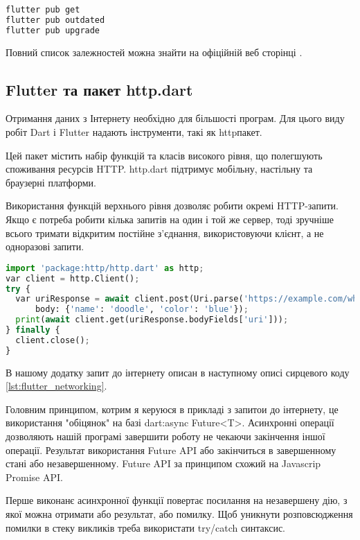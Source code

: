 \begin{lstlisting}[style=light, language=Python,label={lst:flutter_pub},caption=Flutter Dependency Resolution]
flutter pub get
flutter pub outdated
flutter pub upgrade
\end{lstlisting}

Повний список залежностей можна знайти на офіційній веб сторінці \cite{flutter_cli}.

\subsection{Flutter та пакет http.dart}
\label{subsec:flutter_http_dart_theory}
Отримання даних з Інтернету необхідно для більшості програм.
Для цього виду робіт Dart і Flutter надають інструменти, такі як httpпакет.

Цей пакет містить набір функцій та класів високого рівня, що полегшують споживання ресурсів HTTP.
http.dart підтримує мобільну, настільну та браузерні платформи.

Використання функцій верхнього рівня дозволяє робити окремі HTTP-запити.
Якщо є потреба робити кілька запитів на один і той же сервер, тоді зручніше всього тримати відкритим постійне з’єднання,
використовуючи клієнт, а не одноразові запити.

\begin{lstlisting}[style=light, language=Python,label={lst:flutter_pub},caption=Flutter Dependency Resolution]
import 'package:http/http.dart' as http;
var client = http.Client();
try {
  var uriResponse = await client.post(Uri.parse('https://example.com/whatsit/create'),
      body: {'name': 'doodle', 'color': 'blue'});
  print(await client.get(uriResponse.bodyFields['uri']));
} finally {
  client.close();
}
\end{lstlisting}

В нашому додатку запит до інтернету описан в наступному описі сирцевого коду \ref{lst:flutter_networking}.

Головним принципом, котрим я керуюся в прикладі з запитои до інтернету, це використання "обіцянок" на базі dart:async Future<T>.
Асинхронні операції дозволяють нашій програмі завершити роботу не чекаючи закінчення іншої операції.
Результат використання Future API або закінчиться в завершенному стані або незавершенному.
Future API за принципом схожий на Javascrip Promise API.

Перше виконанє асинхронної функції повертає посилання на незавершену дію, з якої можна отримати або результат, або помилку.
Щоб уникнути розповсюдження помилки в стеку викликів треба використати try/catch синтаксис.

